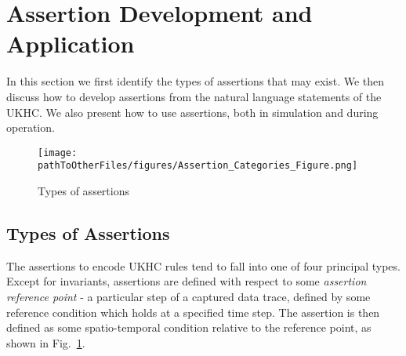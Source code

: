 \section{Assertion Development and Application}\label{Use_of_assertions}
In this section we first identify the types of assertions that may exist. We then discuss how to develop assertions from the natural language statements of the UKHC. We also present how to use assertions, both in simulation and during operation.

\begin{figure}[!b]
    \centering
    \texttt{[image: \\pathToOtherFiles/figures/Assertion\_Categories\_Figure.png]}
    \caption{Types of assertions}
    \label{fig:categories_of_assertions}
\end{figure}


\subsection{Types of Assertions} \label{assertion_categories}

The assertions to encode UKHC rules tend to fall into one of four principal types. Except for invariants, assertions are defined with respect to some \emph{assertion reference point} - a particular step of a captured data trace, defined by some reference condition which holds at a specified time step. The assertion is then defined as some spatio-temporal condition relative to the reference point, as shown in Fig.~\ref{fig:categories_of_assertions}.


